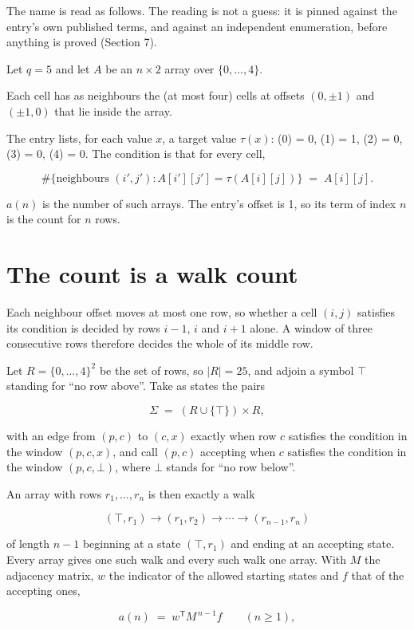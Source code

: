 \documentclass[11pt]{article}
\theoremstyle{definition}
\begin{document}
The name is read as follows. The reading is not a guess: it is pinned against the entry's own published terms, and against an independent enumeration, before anything is proved (Section 7).

Let $q = 5$ and let $A$ be an $n \times 2$ array over $\{0,\dots,4\}$.

Each cell has as neighbours the (at most four) cells at offsets $(0,\pm1)$ and $(\pm1,0)$ that lie inside the array.

The entry lists, for each value $x$, a target value $\tau(x)$: \tau(0) = 0, \tau(1) = 1, \tau(2) = 0, \tau(3) = 0, \tau(4) = 0. The condition is that for every cell,

\[\#\{\text{neighbours } (i',j') : A[i'][j'] = \tau(A[i][j])\} \;=\; A[i][j].\]

$a(n)$ is the number of such arrays. The entry's offset is 1, so its term of index $n$ is the count for $n$ rows.

\section{The count is a walk count}

Each neighbour offset moves at most one row, so whether a cell $(i,j)$ satisfies its condition is decided by rows $i-1$, $i$ and $i+1$ alone. A window of three consecutive rows therefore decides the whole of its middle row.

Let $R = \{0,\dots,4\}^{2}$ be the set of rows, so $|R| = 25$, and adjoin a symbol $\top$ standing for ``no row above''. Take as states the pairs

\[\Sigma \;=\; (R \cup \{\top\}) \times R,\]

with an edge from $(p,c)$ to $(c,x)$ exactly when row $c$ satisfies the condition in the window $(p,c,x)$, and call $(p,c)$ accepting when $c$ satisfies the condition in the window $(p,c,\bot)$, where $\bot$ stands for ``no row below''.

An array with rows $r_1,\dots,r_n$ is then exactly a walk

\[(\top,r_1) \to (r_1,r_2) \to \cdots \to (r_{n-1},r_n)\]

of length $n-1$ beginning at a state $(\top,r_1)$ and ending at an accepting state. Every array gives one such walk and every such walk one array. With $M$ the adjacency matrix, $w$ the indicator of the allowed starting states and $f$ that of the accepting ones,

\[a(n) \;=\; w^{\mathsf T} M^{\,n-1} f \qquad (n \ge 1),\]
\end{document}
